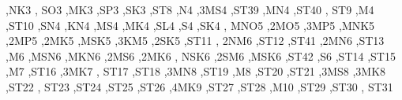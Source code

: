 \begin{DoxyCompactItemize}
\textquotesingle{},\textquotesingle{}\+N\+K3 \textquotesingle{}, \textquotesingle{}\+S\+O3 \textquotesingle{},\textquotesingle{}\+M\+K3 \textquotesingle{},\textquotesingle{}\+S\+P3 \textquotesingle{},\textquotesingle{}\+S\+K3 \textquotesingle{},\textquotesingle{}\+S\+T8 \textquotesingle{},\textquotesingle{}\+N4 \textquotesingle{},\textquotesingle{}3\+M\+S4 \textquotesingle{},\textquotesingle{}\+S\+T39 \textquotesingle{},\textquotesingle{}\+M\+N4 \textquotesingle{},\textquotesingle{}\+S\+T40 \textquotesingle{}, \textquotesingle{}\+S\+T9 \textquotesingle{},\textquotesingle{}\+M4 \textquotesingle{},\textquotesingle{}\+S\+T10 \textquotesingle{},\textquotesingle{}\+S\+N4 \textquotesingle{},\textquotesingle{}\+K\+N4 \textquotesingle{},\textquotesingle{}\+M\+S4 \textquotesingle{},\textquotesingle{}\+M\+K4 \textquotesingle{},\textquotesingle{}\+S\+L4 \textquotesingle{},\textquotesingle{}\+S4 \textquotesingle{},\textquotesingle{}\+S\+K4 \textquotesingle{}, \textquotesingle{}\+M\+N\+O5 \textquotesingle{},\textquotesingle{}2\+M\+O5 \textquotesingle{},\textquotesingle{}3\+M\+P5 \textquotesingle{},\textquotesingle{}\+M\+N\+K5 \textquotesingle{},\textquotesingle{}2\+M\+P5 \textquotesingle{},\textquotesingle{}2\+M\+K5 \textquotesingle{},\textquotesingle{}\+M\+S\+K5 \textquotesingle{},\textquotesingle{}3\+K\+M5 \textquotesingle{},\textquotesingle{}2\+S\+K5 \textquotesingle{},\textquotesingle{}\+S\+T11 \textquotesingle{}, \textquotesingle{}2\+N\+M6 \textquotesingle{},\textquotesingle{}\+S\+T12 \textquotesingle{},\textquotesingle{}\+S\+T41 \textquotesingle{},\textquotesingle{}2\+M\+N6 \textquotesingle{},\textquotesingle{}\+S\+T13 \textquotesingle{},\textquotesingle{}\+M6 \textquotesingle{},\textquotesingle{}\+M\+S\+N6 \textquotesingle{},\textquotesingle{}\+M\+K\+N6 \textquotesingle{},\textquotesingle{}2\+M\+S6 \textquotesingle{},\textquotesingle{}2\+M\+K6 \textquotesingle{}, \textquotesingle{}\+N\+S\+K6 \textquotesingle{},\textquotesingle{}2\+S\+M6 \textquotesingle{},\textquotesingle{}\+M\+S\+K6 \textquotesingle{},\textquotesingle{}\+S\+T42 \textquotesingle{},\textquotesingle{}\+S6 \textquotesingle{},\textquotesingle{}\+S\+T14 \textquotesingle{},\textquotesingle{}\+S\+T15 \textquotesingle{},\textquotesingle{}\+M7 \textquotesingle{},\textquotesingle{}\+S\+T16 \textquotesingle{},\textquotesingle{}3\+M\+K7 \textquotesingle{}, \textquotesingle{}\+S\+T17 \textquotesingle{},\textquotesingle{}\+S\+T18 \textquotesingle{},\textquotesingle{}3\+M\+N8 \textquotesingle{},\textquotesingle{}\+S\+T19 \textquotesingle{},\textquotesingle{}\+M8 \textquotesingle{},\textquotesingle{}\+S\+T20 \textquotesingle{},\textquotesingle{}\+S\+T21 \textquotesingle{},\textquotesingle{}3\+M\+S8 \textquotesingle{},\textquotesingle{}3\+M\+K8 \textquotesingle{},\textquotesingle{}\+S\+T22 \textquotesingle{}, \textquotesingle{}\+S\+T23 \textquotesingle{},\textquotesingle{}\+S\+T24 \textquotesingle{},\textquotesingle{}\+S\+T25 \textquotesingle{},\textquotesingle{}\+S\+T26 \textquotesingle{},\textquotesingle{}4\+M\+K9 \textquotesingle{},\textquotesingle{}\+S\+T27 \textquotesingle{},\textquotesingle{}\+S\+T28 \textquotesingle{},\textquotesingle{}\+M10 \textquotesingle{},\textquotesingle{}\+S\+T29 \textquotesingle{},\textquotesingle{}\+S\+T30 \textquotesingle{}, \textquotesingle{}\+S\+T31 
\end{DoxyCompactItemize}
